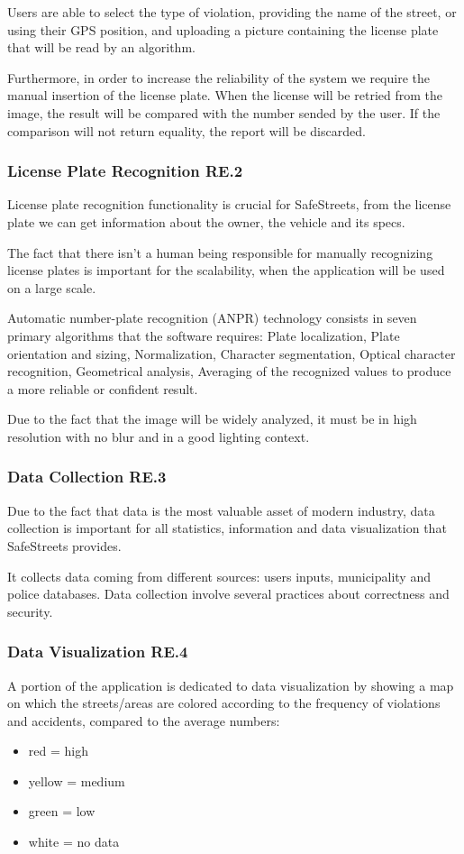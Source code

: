 Users are able to select the type of violation, providing the name of the street, or using their GPS position, and uploading a picture containing the license plate that will be read by an algorithm.

Furthermore, in order to increase the reliability of the system we require the manual insertion of the license plate. When the license will be retried from the image, the result will be compared with the number sended by the user. If the comparison will not return equality, the report will be discarded.

\subsubsection{License Plate Recognition RE.2}
License plate recognition functionality is crucial for SafeStreets, from the license plate we can get information about the owner, the vehicle and its specs.

The fact that there isn't a human being responsible for manually recognizing license plates is important for the scalability, when the application will be used on a large scale.

Automatic number-plate recognition (ANPR) technology consists in seven primary algorithms that the software requires: Plate localization, Plate orientation and sizing, Normalization, Character segmentation, Optical character recognition, Geometrical analysis, Averaging of the recognized values to produce a more reliable or confident result.

Due to the fact that the image will be widely analyzed, it must be in high resolution with no blur and in a good lighting context.

\subsubsection{Data Collection RE.3}
Due to the fact that data is the most valuable asset of modern industry, data collection is important for all statistics, information and data visualization that SafeStreets provides.

It collects data coming from different sources: users inputs, municipality and police databases.
Data collection involve several practices about correctness and security.

\subsubsection{Data Visualization RE.4}
A portion of the application is dedicated to data visualization by showing a map on which the streets/areas are colored according to the frequency of violations and accidents, compared to the average numbers: 
\begin{itemize}
\item red = high
\item yellow = medium
\item green = low
\item white = no data
\end{itemize}

